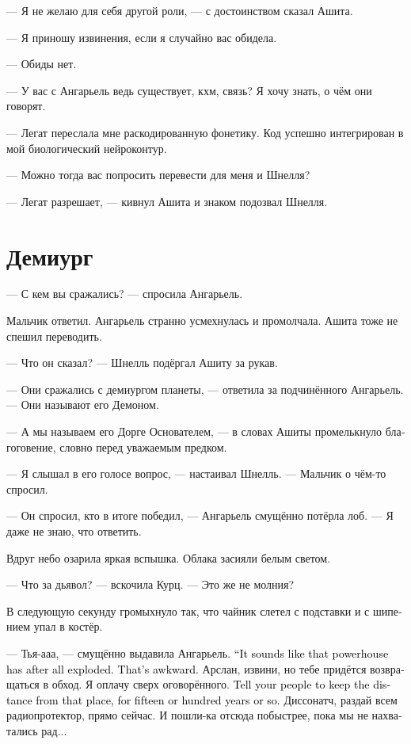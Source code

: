 \documentclass[a4paper,12pt,fleqn]{book}\usepackage{cooltooltips}\usepackage{polyglossia}\setdefaultlanguage[babelshorthands=true]{russian}\setotherlanguage{english}\defaultfontfeatures{Ligatures=TeX,Mapping=tex-text} \usepackage{xcolor}\definecolor{lightgray}{HTML}{bbbbbb}\color{lightgray}\newcommand{\ml}[3]{\textenglish{\textcolor{black}{#3}}}
\begin{document}
--- Я не желаю для себя другой роли, --- с достоинством сказал Ашита.

--- Я приношу извинения, если я случайно вас обидела.

--- Обиды нет.

--- У вас с Ангарьель ведь существует, кхм, связь?
Я хочу знать, о чём они говорят.

--- Легат переслала мне раскодированную фонетику.
Код успешно интегрирован в мой биологический нейроконтур.

--- Можно тогда вас попросить перевести для меня и Шнелля?

--- Легат разрешает, --- кивнул Ашита и знаком подозвал Шнелля.

\section{Демиург}

--- С кем вы сражались? --- спросила Ангарьель.

Мальчик ответил.
Ангарьель странно усмехнулась и промолчала.
Ашита тоже не спешил переводить.

--- Что он сказал? --- Шнелль подёргал Ашиту за рукав.

--- Они сражались с демиургом планеты, --- ответила за подчинённого Ангарьель.
--- Они называют его Демоном.

--- А мы называем его Дорге Основателем, --- в словах Ашиты промелькнуло благоговение, словно перед уважаемым предком.

--- Я слышал в его голосе вопрос, --- настаивал Шнелль.
--- Мальчик о чём-то спросил.

--- Он спросил, кто в итоге победил, --- Ангарьель смущённо потёрла лоб.
--- Я даже не знаю, что ответить.

Вдруг небо озарила яркая вспышка.
Облака засияли белым светом.

--- Что за дьявол? --- вскочила Курц.
--- Это же не молния?

В следующую секунду громыхнуло так, что чайник слетел с подставки и с шипением упал в костёр.

--- Тья-ааа, --- смущённо выдавила Ангарьель.
\ml{$0$}
{--- Похоже, тот генератор всё-таки рванул.}
{``It sounds like that powerhouse has after all exploded.}
\ml{$0$}
{Неудобно вышло.}
{That's awkward.}
Арслан, извини, но тебе придётся возвращаться в обход.
Я оплачу сверх оговорённого.
\ml{$0$}
{Скажи своим, чтобы ближайшие пятьдесят-сто лет там не ходили.}
{Tell your people to keep the distance from that place, for fifteen or hundred years or so.}
Диссонатч, раздай всем радиопротектор, прямо сейчас.
И пошли-ка отсюда побыстрее, пока мы не нахватались рад...
\end{document}
